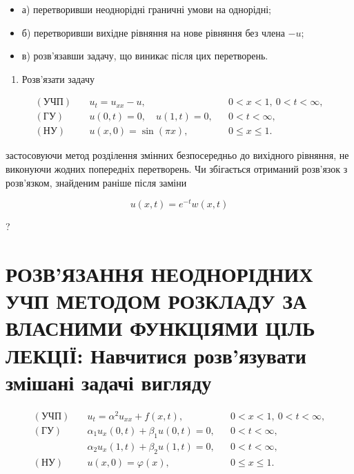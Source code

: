 \documentclass[
  ukrainian,
]{article}
\providecommand{\tightlist}{%
  \setlength{\itemsep}{0pt}\setlength{\parskip}{0pt}}
\begin{document}
\begin{itemize}
\tightlist
\item
  а) перетворивши неоднорідні граничні умови на однорідні;
\item
  б) перетворивши вихідне рівняння на нове рівняння без члена \(-u\);
\item
  в) розв'язавши задачу, що виникає після цих перетворень.
\end{itemize}

\begin{enumerate}
\def\labelenumi{\arabic{enumi}.}
\setcounter{enumi}{2}
\tightlist
\item
  Розв'язати задачу
\end{enumerate}

\[
\begin{aligned}
(\text{УЧП})\quad & u_t = u_{xx} - u, && 0 < x < 1,\ 0 < t < \infty, \\
(\text{ГУ})\quad & u(0,t) = 0,\quad u(1,t) = 0, && 0 < t < \infty, \\
(\text{НУ})\quad & u(x,0) = \sin(\pi x), && 0 \leqslant x \leqslant 1.
\end{aligned}
\]

застосовуючи метод розділення змінних безпосередньо до вихідного
рівняння, не виконуючи жодних попередніх перетворень. Чи збігається
отриманий розв'язок з розв'язком, знайденим раніше після заміни

\[
u(x,t) = e^{-t}w(x,t)
\]

?

\section{РОЗВ'ЯЗАННЯ НЕОДНОРІДНИХ УЧП МЕТОДОМ РОЗКЛАДУ ЗА ВЛАСНИМИ
ФУНКЦІЯМИ ЦІЛЬ ЛЕКЦІЇ: Навчитися розв'язувати змішані задачі
вигляду}\label{ux440ux43eux437ux432ux44fux437ux430ux43dux43dux44f-ux43dux435ux43eux434ux43dux43eux440ux456ux434ux43dux438ux445-ux443ux447ux43f-ux43cux435ux442ux43eux434ux43eux43c-ux440ux43eux437ux43aux43bux430ux434ux443-ux437ux430-ux432ux43bux430ux441ux43dux438ux43cux438-ux444ux443ux43dux43aux446ux456ux44fux43cux438-ux446ux456ux43bux44c-ux43bux435ux43aux446ux456ux457-ux43dux430ux432ux447ux438ux442ux438ux441ux44f-ux440ux43eux437ux432ux44fux437ux443ux432ux430ux442ux438-ux437ux43cux456ux448ux430ux43dux456-ux437ux430ux434ux430ux447ux456-ux432ux438ux433ux43bux44fux434ux443}

\[
\begin{aligned}
(\text{УЧП})\quad & u_t = \alpha^2 u_{xx} + f(x,t), && 0 < x < 1,\ 0 < t < \infty, \\
(\text{ГУ})\quad & \alpha_1 u_x(0,t) + \beta_1 u(0,t) = 0, && 0 < t < \infty, \\
& \alpha_2 u_x(1,t) + \beta_2 u(1,t) = 0, && 0 < t < \infty, \\
(\text{НУ})\quad & u(x,0) = \varphi(x), && 0 \leqslant x \leqslant 1.
\end{aligned}
\]
\end{document}
